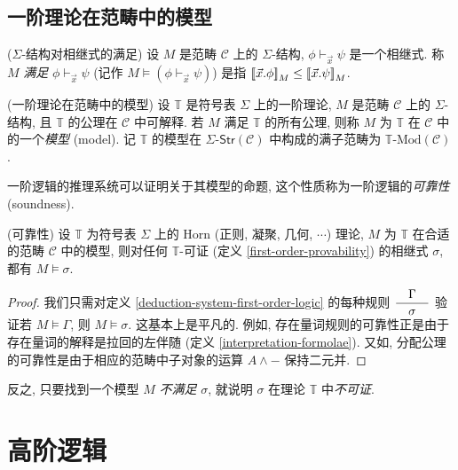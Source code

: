 \subsection{一阶理论在范畴中的模型}

\begin{definition}
	{($\Sigma$-结构对相继式的满足)}
	设 $M$ 是范畴 $\mathcal C$ 上的 $\Sigma$-结构, $\phi\vdash_{\vec x}\psi$ 是一个相继式.
	称 $M$ \emph{满足} $\phi\vdash_{\vec x}\psi$ (记作 $M\models(\phi\vdash_{\vec x}\psi)$) 是指 ${[\![\vec x.\phi]\!]}_M \leq {[\![\vec x.\psi]\!]}_M$.
\end{definition}

\begin{definition}
	{(一阶理论在范畴中的模型)}
	设 $\mathbb T$ 是符号表 $\Sigma$ 上的一阶理论, $M$ 是范畴 $\mathcal C$ 上的 $\Sigma$-结构,
	且 $\mathbb T$ 的公理在 $\mathcal C$ 中可解释.
	若 $M$ 满足 $\mathbb T$ 的所有公理, 则称 $M$ 为 $\mathbb T$ 在 $\mathcal C$ 中的一个\emph{模型} (model).
	记 $\mathbb T$ 的模型在 $\Sigma\text{-}\mathsf{Str}(\mathcal C)$ 中构成的满子范畴为 $\mathbb T\text{-Mod}(\mathcal C)$.
\end{definition}

一阶逻辑的推理系统可以证明关于其模型的命题, 这个性质称为一阶逻辑的\emph{可靠性} (soundness).

\begin{prop}
	[label={soundness-first-order-logic}]
	{(可靠性)}
	设 $\mathbb T$ 为符号表 $\Sigma$ 上的 Horn (正则, 凝聚, 几何, $\cdots$) 理论, $M$ 为 $\mathbb T$ 在合适的范畴 $\mathcal C$ 中的模型, 则对任何 $\mathbb T$-可证 (定义 \ref{first-order-provability}) 的相继式 $\sigma$, 都有 $M\models\sigma$.
\end{prop}
\begin{proof}
	我们只需对定义 \ref{deduction-system-first-order-logic} 的每种规则 $\displaystyle\dfrac{\quad \Gamma \quad}{\quad \sigma \quad}$ 验证若 $M\models\Gamma$, 则 $M\models\sigma$. 这基本上是平凡的. 例如, 存在量词规则的可靠性正是由于存在量词的解释是拉回的左伴随 (定义 \ref{interpretation-formolae}). 又如, 分配公理的可靠性是由于相应的范畴中子对象的运算 $A\land {-}$ 保持二元并.
\end{proof}

\begin{remark}
	{}
	反之, 只要找到一个模型 $M$ \emph{不满足} $\sigma$, 就说明 $\sigma$ 在理论 $\mathbb T$ 中\emph{不可证}.
\end{remark}

\section{高阶逻辑}

